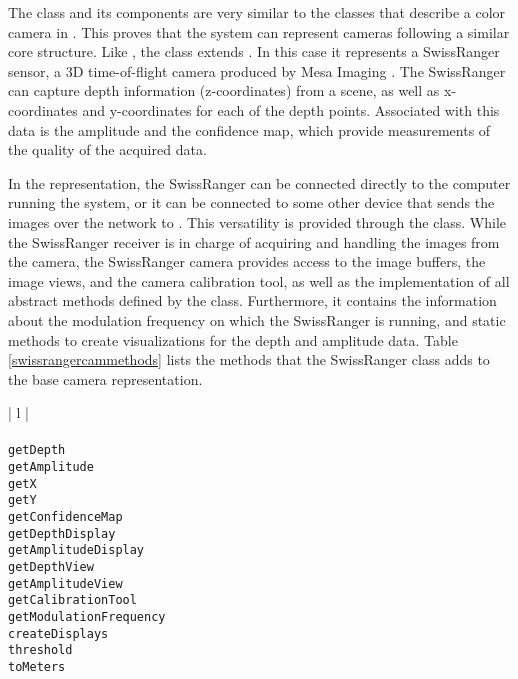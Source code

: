 The \SwissRangerCam{} class and its components are very similar to the classes that describe a color 
camera in \RD{}. This proves that the system can represent cameras following a similar core structure. Like 
\ColorCam{}, the \SwissRangerCam{} class extends \Camera{}. In this case it represents a SwissRanger
sensor, a 3D time-of-flight camera produced by Mesa Imaging \cite{SR4000Manual}. The SwissRanger 
can capture depth information (z-coordinates) from a scene, as well as x-coordinates and y-coordinates for 
each of the depth points. Associated with this data is the amplitude and the confidence map, which provide
measurements of the quality of the acquired data. 

In the representation, the SwissRanger can be connected directly to the computer running the system, or it 
can be connected to some other device that sends the images over the network to \RD{}. This versatility is 
provided through the \SwissRangerReceiver{} class. While the SwissRanger receiver is in charge of acquiring 
and handling the images from the camera, the SwissRanger camera provides access to the image buffers, 
the image views, and the camera calibration tool, as well as the implementation of all abstract methods 
defined by the \Camera{} class. Furthermore, it contains the information about the modulation frequency 
on which the SwissRanger is running, and static methods to create visualizations for the depth and amplitude 
data. Table \ref{swissrangercammethods} lists the methods that the SwissRanger class adds to the base 
camera representation.

\begin{table}[ht]
\caption{Public methods in the \SwissRangerCam{} class}
\begin{center}
\begin{tabular}{| l |}
	\hline 
	 \\
	 \\
	\hline \hline
	\texttt{getDepth} \\
	\texttt{getAmplitude} \\
	\texttt{getX} \\
	\texttt{getY} \\
	\texttt{getConfidenceMap} \\
	\texttt{getDepthDisplay} \\
	\texttt{getAmplitudeDisplay} \\
	\texttt{getDepthView} \\
	\texttt{getAmplitudeView} \\
	\texttt{getCalibrationTool} \\
	\texttt{getModulationFrequency} \\
	\texttt{createDisplays} \\
	\texttt{threshold} \\
	\texttt{toMeters} \\
	\hline
\end{tabular}
\end{center}
\label{swissrangercammethods}
\end{table}

